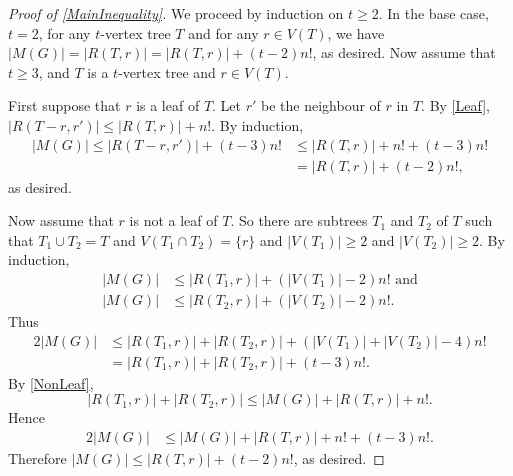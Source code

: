 \documentclass[a4paper,11pt]{article}
\renewcommand{\geq}{\geqslant}
\renewcommand{\leq}{\leqslant}
\begin{document}
\begin{proof}[Proof of \eqref{MainInequality}]
We proceed by induction on $t\geq2$. 
In the base case,  $t=2$, for any $t$-vertex tree $T$ and for any $r\in V(T)$, we have 
$|M(G)| =  |R(T,r)| =  |R(T,r)| + (t-2)n!$, as desired. 
Now assume that $t\geq 3$, and $T$ is a $t$-vertex tree and $r\in V(T)$. 

First suppose that $r$ is a leaf of $T$. Let $r'$ be the neighbour of $r$ in $T$. 
By \cref{Leaf}, 
$|R(T-r,r')| \leq |R(T,r)| + n!$. 
By induction, 
\begin{align*}
|M(G)| 
 \leq |R(T-r,r')| + (t-3)n! 
& \leq |R(T,r)| +n! + (t-3)n! \\
& = |R(T,r)| + (t-2)n! ,
\end{align*}
 as desired. 

Now assume that $r$ is not a leaf of $T$. So there are subtrees $T_1$ and $T_2$ of $T$ such that $T_1\cup T_2=T$ and $V(T_1\cap T_2)=\{r\}$ and $|V(T_1)|\geq 2$ and $|V(T_2)|\geq 2$. 
By induction, 
\begin{align*}
|M(G)| & \leq |R(T_1,r)| + ( |V(T_1)|-2)n! \text{ and}\\
|M(G)| & \leq |R(T_2,r)| + ( |V(T_2)|-2)n!.
\end{align*}
Thus
\begin{align*}
2|M(G)| 
& \leq  |R(T_1,r)| + |R(T_2,r)| + ( |V(T_1)|+|V(T_2)|-4)n! \\
& =  |R(T_1,r)| + |R(T_2,r)| + ( t-3)n! .
\end{align*}
By \cref{NonLeaf},
\[ |R(T_1,r)| + |R(T_2,r)| \leq |M(G)| + |R(T,r)| + n!. \]
Hence
\begin{align*}
2|M(G)| & \leq |M(G)| + |R(T,r)| + n! + ( t-3)n! .
\end{align*} 
Therefore $|M(G)| \leq |R(T,r)|  + ( t-2)n!$, 
as desired. 
\end{proof}
\end{document}
